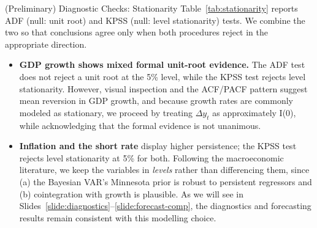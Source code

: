 \documentclass[9pt]{beamer}
\begin{document}
\begin{frame}{(Preliminary) Diagnostic Checks: Stationarity}
\label{slide:stationarity}
\footnotesize
Table~\ref{tab:stationarity} reports ADF (null: unit root) and KPSS (null: level stationarity) tests. We combine the two so that conclusions agree only when both procedures reject in the appropriate direction.

{\footnotesize
\setlength{\tabcolsep}{5pt}

}

\footnotesize
\begin{itemize}
  \item \textbf{GDP growth shows mixed formal unit-root evidence.} The ADF test does not reject a unit root at the 5\% level, while the KPSS test rejects level stationarity. However, visual inspection and the ACF/PACF pattern suggest mean reversion in GDP growth, and because growth rates are commonly modeled as stationary, we proceed by treating $\Delta y_t$ as approximately I(0), while acknowledging that the formal evidence is not unanimous.

  \item \textbf{Inflation and the short rate} display higher persistence; the KPSS test rejects level stationarity at 5\% for both. Following the macroeconomic literature, we keep the variables in \textit{levels} rather than differencing them, since (a) the Bayesian VAR's Minnesota prior is robust to persistent regressors and (b) cointegration with growth is plausible. As we will see in Slides~\ref{slide:diagnostics}--\ref{slide:forecast-comp}, the diagnostics and forecasting results remain consistent with this modelling choice.
\end{itemize}

\end{frame}
\end{document}
